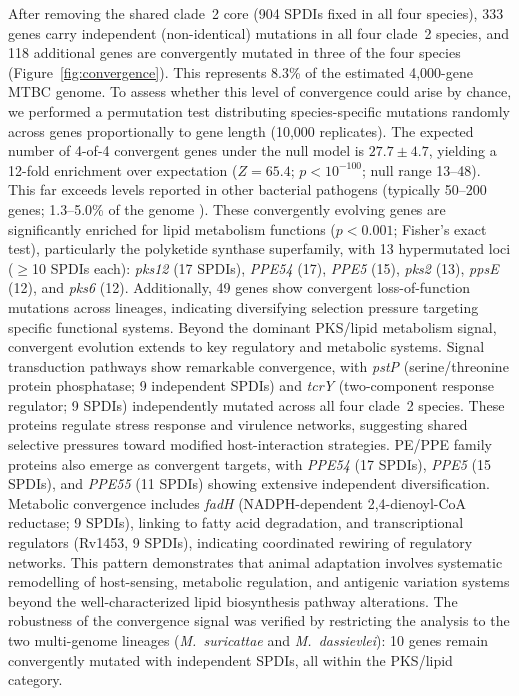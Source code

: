 \documentclass[11pt,a4paper]{article}
\newcommand{\Msur}{\textit{M.~suricattae}}
\newcommand{\Mdas}{\textit{M.~dassievlei}}
\begin{document}
After removing the shared clade~2 core (904 SPDIs fixed in all four species),
333 genes carry independent (non-identical) mutations in all four clade~2
species, and 118 additional genes are convergently mutated in three of the
four species (Figure~\ref{fig:convergence}). This represents 8.3\% of the
estimated 4{,}000-gene MTBC genome.
%
To assess whether this level of convergence could arise by chance, we performed
a permutation test distributing species-specific mutations randomly across
genes proportionally to gene length (10{,}000 replicates).
The expected number of 4-of-4 convergent genes under the null model is
$27.7 \pm 4.7$, yielding a 12-fold enrichment over expectation
($Z = 65.4$; $p < 10^{-100}$; null range 13--48).
This far exceeds levels reported in other bacterial pathogens (typically
50--200 genes; 1.3--5.0\% of the genome \cite{Marvig2015}).
%
These convergently evolving genes are significantly enriched for lipid
metabolism functions ($p < 0.001$; Fisher's exact test), particularly the
polyketide synthase superfamily, with 13 hypermutated loci ($\geq$10 SPDIs each):
\textit{pks12} (17 SPDIs), \textit{PPE54} (17), \textit{PPE5} (15), \textit{pks2} (13),
\textit{ppsE} (12), and \textit{pks6} (12). Additionally, 49 genes show
convergent loss-of-function mutations across lineages, indicating diversifying
selection pressure targeting specific functional systems.
%
Beyond the dominant PKS/lipid metabolism signal, convergent evolution extends to key regulatory and metabolic systems. Signal transduction pathways show remarkable convergence, with \textit{pstP} (serine/threonine protein phosphatase; 9 independent SPDIs) and \textit{tcrY} (two-component response regulator; 9 SPDIs) independently mutated across all four clade~2 species. These proteins regulate stress response and virulence networks, suggesting shared selective pressures toward modified host-interaction strategies. PE/PPE family proteins also emerge as convergent targets, with \textit{PPE54} (17 SPDIs), \textit{PPE5} (15 SPDIs), and \textit{PPE55} (11 SPDIs) showing extensive independent diversification. Metabolic convergence includes \textit{fadH} (NADPH-dependent 2,4-dienoyl-CoA reductase; 9 SPDIs), linking to fatty acid degradation, and transcriptional regulators (Rv1453, 9 SPDIs), indicating coordinated rewiring of regulatory networks. This pattern demonstrates that animal adaptation involves systematic remodelling of host-sensing, metabolic regulation, and antigenic variation systems beyond the well-characterized lipid biosynthesis pathway alterations.
%
The robustness of the convergence signal was verified by restricting the analysis
to the two multi-genome lineages (\Msur{} and \Mdas{}): 10 genes remain
convergently mutated with independent SPDIs, all within the PKS/lipid category.
\end{document}
